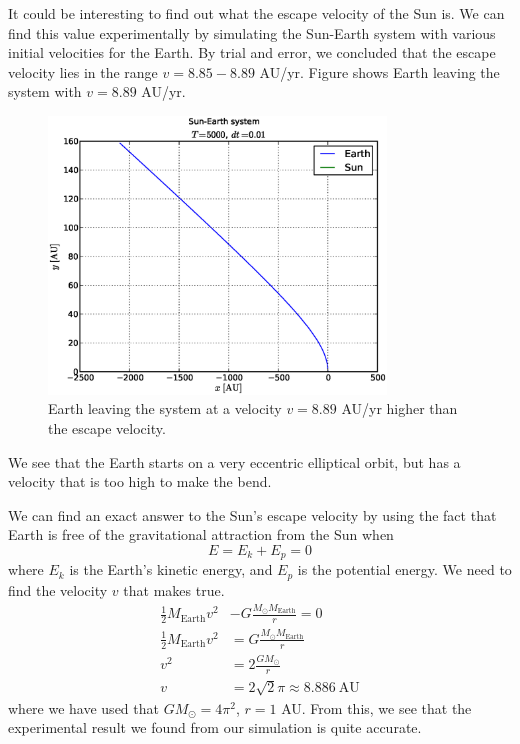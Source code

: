 
It could be interesting to find out what the escape velocity of the Sun is. We
can find this value experimentally by simulating the Sun-Earth system with
various initial velocities for the Earth. By trial and error, we concluded that
the escape velocity lies in the range $v = 8.85 - 8.89$ AU/yr. Figure
 shows Earth leaving the system with $v = 8.89$ AU/yr.
%
\begin{figure}[htpb]
	\centering
	\includegraphics[width=0.8\textwidth]{figures/sun_earth_T5000_dt1e-2}
	\caption{Earth leaving the system at a velocity $v = 8.89$ AU/yr higher
		than the escape	velocity.}
	\label{fig:escapevel}
\end{figure}
%
We see that the Earth starts on a very eccentric elliptical orbit, but has a
velocity that is too high to make the bend.

We can find an exact answer to the Sun's escape velocity by using the fact that
Earth is free of the gravitational attraction from the Sun when
\begin{equation}
	E = E_k + E_p = 0
	\label{eq:Eequal0}
\end{equation}
where $E_k$ is the Earth's kinetic energy, and $E_p$ is the potential energy. We
need to find the velocity $v$ that makes  true.
%
\begin{align*}
	\frac{1}{2}M_{\text{Earth}}v^2 &- G \frac{M_{\odot} M_{\text{Earth}}}{r}
	= 0 \\
	\frac{1}{2}M_{\text{Earth}}v^2 &= G \frac{M_{\odot} M_{\text{Earth}}}{r} \\
	v^2 &= 2\frac{GM_{\odot}}{r} \\
	v &= 2\sqrt{2}\pi \approx 8.886 \ \text{AU} 
\end{align*}
%
where we have used that $GM_{\odot} = 4\pi^2$, $r = 1$ AU. From this, we see
that the experimental result we found from our simulation is quite accurate.
